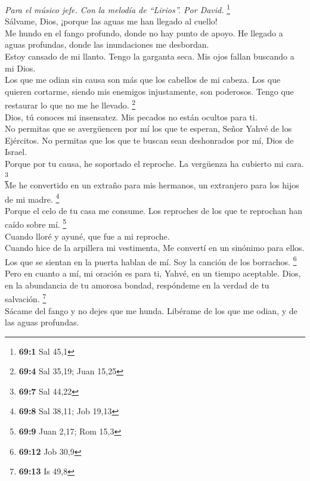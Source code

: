 \emph{Para el músico jefe. Con la melodía de ``Lirios''. Por David.}
\footnote{\textbf{69:1} Sal 45,1}\\
 Sálvame, Dios, ¡porque las aguas me han llegado al
cuello!\\
 Me hundo en el fango profundo, donde no hay punto de
apoyo. He llegado a aguas profundas, donde las inundaciones me
desbordan.\\
 Estoy cansado de mi llanto. Tengo la garganta seca. Mis
ojos fallan buscando a mi Dios.\\
 Los que me odian sin causa son más que los cabellos de mi
cabeza. Los que quieren cortarme, siendo mis enemigos injustamente, son
poderosos. Tengo que restaurar lo que no me he llevado. \footnote{\textbf{69:4}
  Sal 35,19; Juan 15,25}\\
 Dios, tú conoces mi insensatez. Mis pecados no están
ocultos para ti.\\
 No permitas que se avergüencen por mí los que te esperan,
Señor Yahvé de los Ejércitos. No permitas que los que te buscan sean
deshonrados por mí, Dios de Israel.\\
 Porque por tu causa, he soportado el reproche. La
vergüenza ha cubierto mi cara. \footnote{\textbf{69:7} Sal 44,22}\\
 Me he convertido en un extraño para mis hermanos, un
extranjero para los hijos de mi madre. \footnote{\textbf{69:8} Sal
  38,11; Job 19,13}\\
 Porque el celo de tu casa me consume. Los reproches de
los que te reprochan han caído sobre mí. \footnote{\textbf{69:9} Juan
  2,17; Rom 15,3}\\
 Cuando lloré y ayuné, que fue a mi reproche.\\
 Cuando hice de la arpillera mi vestimenta, Me convertí
en un sinónimo para ellos.\\
 Los que se sientan en la puerta hablan de mí. Soy la
canción de los borrachos. \footnote{\textbf{69:12} Job 30,9}\\
 Pero en cuanto a mí, mi oración es para ti, Yahvé, en un
tiempo aceptable. Dios, en la abundancia de tu amorosa bondad,
respóndeme en la verdad de tu salvación. \footnote{\textbf{69:13} Is
  49,8}\\
 Sácame del fango y no dejes que me hunda. Libérame de
los que me odian, y de las aguas profundas.\\
